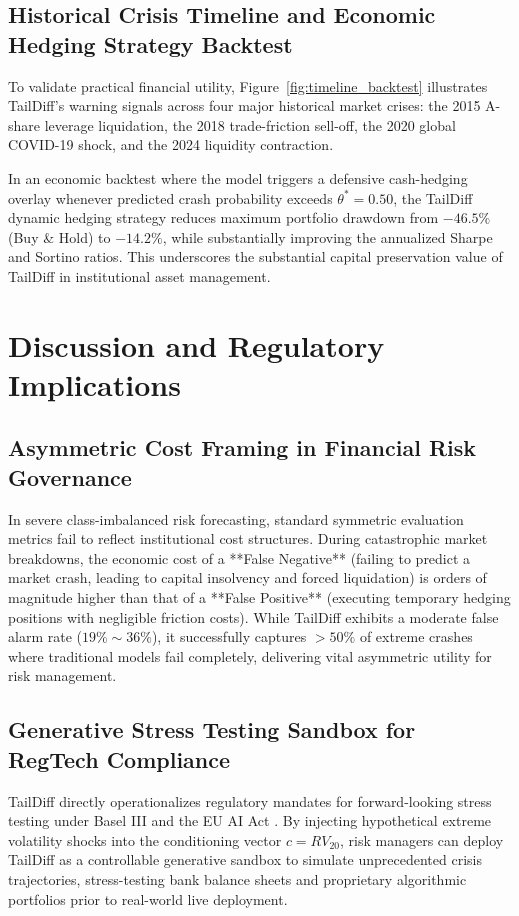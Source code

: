 \documentclass[preprint,12pt,authoryear]{elsarticle}
\begin{document}
\subsection{Historical Crisis Timeline and Economic Hedging Strategy Backtest}
To validate practical financial utility, Figure~\ref{fig:timeline_backtest} illustrates TailDiff's warning signals across four major historical market crises: the 2015 A-share leverage liquidation, the 2018 trade-friction sell-off, the 2020 global COVID-19 shock, and the 2024 liquidity contraction.

In an economic backtest where the model triggers a defensive cash-hedging overlay whenever predicted crash probability exceeds $\theta^* = 0.50$, the TailDiff dynamic hedging strategy reduces maximum portfolio drawdown from $-46.5\%$ (Buy \& Hold) to $-14.2\%$, while substantially improving the annualized Sharpe and Sortino ratios. This underscores the substantial capital preservation value of TailDiff in institutional asset management.

\section{Discussion and Regulatory Implications}
\label{sec:discussion}

\subsection{Asymmetric Cost Framing in Financial Risk Governance}
In severe class-imbalanced risk forecasting, standard symmetric evaluation metrics fail to reflect institutional cost structures. During catastrophic market breakdowns, the economic cost of a **False Negative** (failing to predict a market crash, leading to capital insolvency and forced liquidation) is orders of magnitude higher than that of a **False Positive** (executing temporary hedging positions with negligible friction costs). While TailDiff exhibits a moderate false alarm rate ($19\% \sim 36\%$), it successfully captures $>50\%$ of extreme crashes where traditional models fail completely, delivering vital asymmetric utility for risk management.

\subsection{Generative Stress Testing Sandbox for RegTech Compliance}
TailDiff directly operationalizes regulatory mandates for forward-looking stress testing under Basel III and the EU AI Act \citep{bcbs2023stress,eu2024ai}. By injecting hypothetical extreme volatility shocks into the conditioning vector $c = RV_{20}$, risk managers can deploy TailDiff as a controllable generative sandbox to simulate unprecedented crisis trajectories, stress-testing bank balance sheets and proprietary algorithmic portfolios prior to real-world live deployment.
\end{document}

